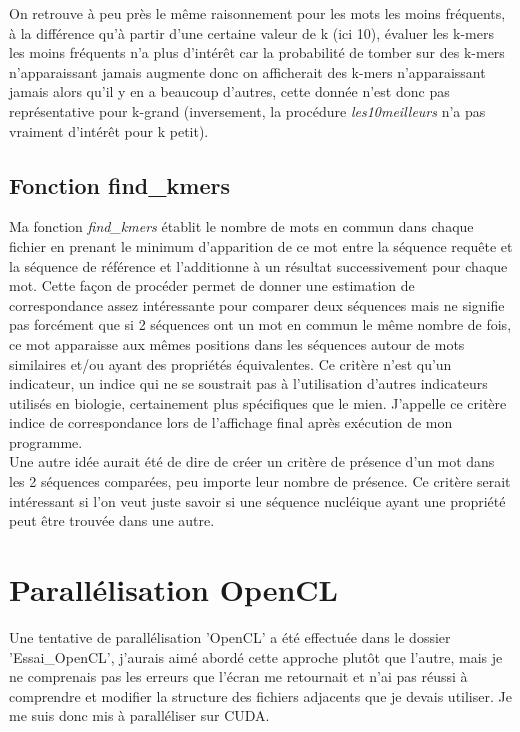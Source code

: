 \documentclass[10pt]{article}
\begin{document}
On retrouve à peu près le même raisonnement pour les mots les moins fréquents, à la différence qu'à partir d'une certaine valeur de k (ici 10), évaluer les k-mers les moins fréquents n'a plus d'intérêt car la probabilité de tomber sur des k-mers n'apparaissant jamais augmente donc on afficherait des k-mers n'apparaissant jamais alors qu'il y en a beaucoup d'autres, cette donnée n'est donc pas représentative pour k-grand (inversement, la procédure \textit{les10meilleurs} n'a pas vraiment d'intérêt pour k petit). \\


\subsection{Fonction find\_kmers}

Ma fonction \textit{find\_kmers} établit le nombre de mots en commun dans chaque fichier en prenant le minimum d'apparition de ce mot entre la séquence requête et la séquence de référence et l'additionne à un résultat successivement pour chaque mot. Cette façon de procéder permet de donner une estimation de correspondance assez intéressante pour comparer deux séquences mais ne signifie pas forcément que si 2 séquences ont un mot en commun le même nombre de fois, ce mot apparaisse aux mêmes positions dans les séquences autour de mots similaires et/ou ayant des propriétés équivalentes. Ce critère n'est qu'un indicateur, un indice qui ne se soustrait pas à l'utilisation d'autres indicateurs utilisés en biologie, certainement plus spécifiques que le mien. J'appelle ce critère indice de correspondance lors de l'affichage final après exécution de mon programme. \\

Une autre idée aurait été de dire de créer un critère de présence d'un mot dans les 2 séquences comparées, peu importe leur nombre de présence. Ce critère serait intéressant si l'on veut juste savoir si une séquence nucléique ayant une propriété peut être trouvée dans une autre.


\section{Parallélisation OpenCL}

Une tentative de parallélisation 'OpenCL' a été effectuée dans le dossier 'Essai\_OpenCL', j'aurais aimé abordé cette approche plutôt que l'autre, mais je ne comprenais pas les erreurs que l'écran me retournait et n'ai pas réussi à comprendre et modifier la structure des fichiers adjacents que je devais utiliser. Je me suis donc mis à paralléliser sur CUDA. \\
\end{document}
